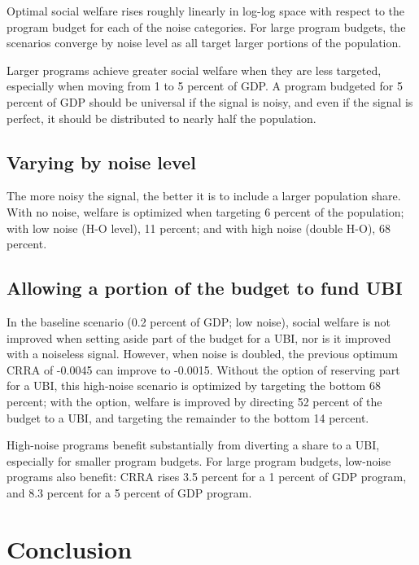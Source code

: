 \documentclass[12pt]{article}
\begin{document}

Optimal social welfare rises roughly linearly in log-log space with respect to 
the program budget for each of the noise categories. For large program budgets, 
the scenarios converge by noise level as all target larger portions of the 
population.


Larger programs achieve greater social welfare when they are less targeted, 
especially when moving from 1 to 5 percent of GDP. A program budgeted for 5 
percent of GDP should be universal if the signal is noisy, and even if the 
signal is perfect, it should be distributed to nearly half the population.


\subsection{Varying by noise level} \label{varying_by_noise}

The more noisy the signal, the better it is to include a larger population 
share. With no noise, welfare is optimized when targeting 6 percent of the 
population; with low noise (H-O level), 11 percent; and with high noise (double 
H-O), 68 percent.


\subsection{Allowing a portion of the budget to fund UBI} \label{ubi_portion}

In the baseline scenario (0.2 percent of GDP; low noise), social welfare is not 
improved when setting aside part of the budget for a UBI, nor is it improved 
with a noiseless signal. However, when noise is doubled, the previous optimum 
CRRA of -0.0045 can improve to -0.0015. Without the option of reserving part 
for a UBI, this high-noise scenario is optimized by targeting the bottom 68 
percent; with the option, welfare is improved by directing 52 percent of the 
budget to a UBI, and targeting the remainder to the bottom 14 percent.

High-noise programs benefit substantially from diverting a share to a UBI, 
especially for smaller program budgets. For large program budgets, low-noise 
programs also benefit: CRRA rises 3.5 percent for a 1 percent of GDP program, 
and 8.3 percent for a 5 percent of GDP program.


\section{Conclusion} \label{sec:conclusion}
\end{document}
